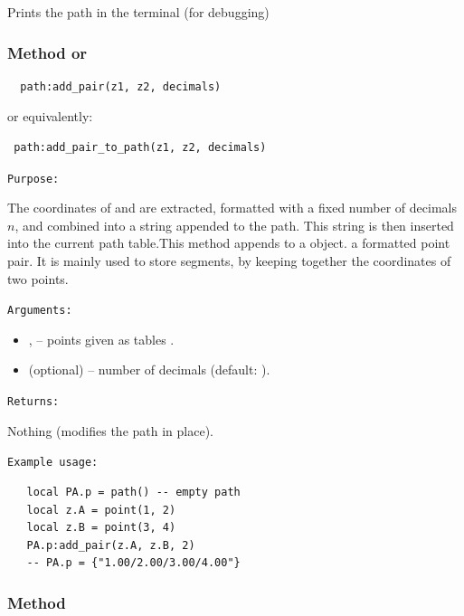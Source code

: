 Prints the path in the terminal (for debugging)

\begin{tkzexample}[latex=.45\textwidth]
\end{tkzexample}

\subsubsection{Method  or }
\label{ssub:subsubsection_name}
\begin{verbatim}
  path:add_pair(z1, z2, decimals)
\end{verbatim}

or equivalently:

\begin{verbatim}
 path:add_pair_to_path(z1, z2, decimals)
\end{verbatim}

\medskip
\texttt{Purpose: }

 The coordinates of  and  are extracted, formatted with a fixed number of decimals $n$, and combined into a string  appended to the path.
This string is then inserted into the current path table.This method appends to a  object. a formatted point pair.
It is mainly used to store segments, by keeping together the coordinates of two points.

\medskip
\texttt{Arguments: }

\begin{itemize}
  \item {},  – points given as tables .
  \item {} (optional) – number of decimals (default: ).
\end{itemize}

\medskip
\texttt{Returns: }

Nothing (modifies the path in place).

\medskip
\texttt{Example usage: }

\begin{verbatim}
   local PA.p = path() -- empty path
   local z.A = point(1, 2)
   local z.B = point(3, 4)
   PA.p:add_pair(z.A, z.B, 2)
   -- PA.p = {"1.00/2.00/3.00/4.00"}
\end{verbatim}


\subsubsection{Method }
\label{ssub:path_concat}

